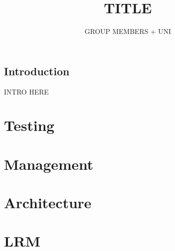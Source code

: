 \documentclass[11pt]{article}
\author{GROUP MEMBERS + UNI}
\title{TITLE}
\begin{document}
\setlength{\parskip}{.1 in}

\maketitle
\newpage

\subsection*{Introduction}

INTRO HERE

\section*{Testing}
 \newpage

\section*{Management}
 \newpage

\section*{Architecture}
 \newpage

\section*{LRM}
 \newpage


% 
\end{document}

